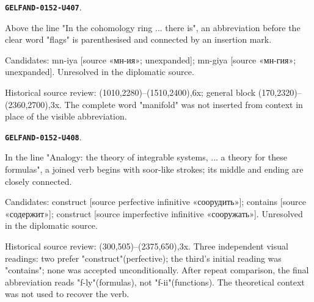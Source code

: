\documentclass[11pt]{article}
\theoremstyle{definition}
\theoremstyle{remark}
\begin{document}
\par\noindent\leavevmode{}\label{GELFAND-0152-U407}\label{GELFAND-P001404:cohomology-insertion:note}\textbf{\texttt{GELFAND-0152-U407}}.\nopagebreak[4]\par
Above the line "In the cohomology ring ... there is", an abbreviation before the clear word "flags" is parenthesised and connected by an insertion mark.\par
Candidates: mn-iya [source «мн-ия»; unexpanded]; mn-giya [source «мн-гия»; unexpanded]. Unresolved in the diplomatic source.\par
Historical source review: (1010,2280)–(1510,2400),6x; general block (170,2320)–(2360,2700),3x. The complete word "manifold" was not inserted from context in place of the visible abbreviation.\par\medskip
\par\noindent\leavevmode{}\label{GELFAND-0152-U408}\label{GELFAND-P001404:analogy-verb:note}\textbf{\texttt{GELFAND-0152-U408}}.\nopagebreak[4]\par
In the line "Analogy: the theory of integrable systems, ... a theory for these formulas", a joined verb begins with soor-like strokes; its middle and ending are closely connected.\par
Candidates: construct [source perfective infinitive «соорудить»]; contains [source «содержит»]; construct [source imperfective infinitive «сооружать»]. Unresolved in the diplomatic source.\par
Historical source review: (300,505)–(2375,650),3x. Three independent visual readings: two prefer "construct"(perfective); the third's initial reading was "contains"; none was accepted unconditionally. After repeat comparison, the final abbreviation reads "f-ly"(formulas), not "f-ii"(functions). The theoretical context was not used to recover the verb.\par\medskip
\end{document}
